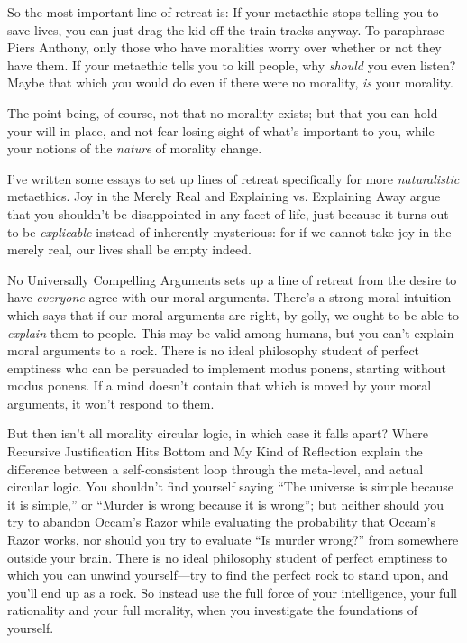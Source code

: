 {
 So the most important line of retreat is: If your metaethic stops
telling you to save lives, you can just drag the kid off the train
tracks anyway. To paraphrase Piers Anthony, only those who have
moralities worry over whether or not they have them. If your metaethic
tells you to kill people, why \textit{should} you even listen? Maybe
that which you would do even if there were no morality, \textit{is}
your morality.}

{
 The point being, of course, not that no morality exists; but that
you can hold your will in place, and not fear losing sight of
what's important to you, while your notions of the
\textit{nature} of morality change.}

{
 I've written some essays to set up lines of
retreat specifically for more \textit{naturalistic} metaethics. Joy in
the Merely Real and Explaining vs. Explaining Away argue that you
shouldn't be disappointed in any facet of life, just
because it turns out to be \textit{explicable} instead of inherently
mysterious: for if we cannot take joy in the merely real, our lives
shall be empty indeed.}

{
 No Universally Compelling Arguments sets up a line of retreat from
the desire to have \textit{everyone} agree with our moral arguments.
There's a strong moral intuition which says that if our
moral arguments are right, by golly, we ought to be able to
\textit{explain} them to people. This may be valid among humans, but
you can't explain moral arguments to a rock. There is
no ideal philosophy student of perfect emptiness who can be persuaded
to implement modus ponens, starting without modus ponens. If a mind
doesn't contain that which is moved by your moral
arguments, it won't respond to them.}

{
 But then isn't all morality circular logic, in
which case it falls apart? Where Recursive Justification Hits Bottom
and My Kind of Reflection explain the difference between a
self-consistent loop through the meta-level, and actual circular logic.
You shouldn't find yourself saying
``The universe is simple because it is
simple,'' or ``Murder is wrong
because it is wrong''; but neither should you try to
abandon Occam's Razor while evaluating the probability
that Occam's Razor works, nor should you try to
evaluate ``Is murder wrong?'' from
somewhere outside your brain. There is no ideal philosophy student of
perfect emptiness to which you can unwind yourself---try to find the
perfect rock to stand upon, and you'll end up as a
rock. So instead use the full force of your intelligence, your full
rationality and your full morality, when you investigate the
foundations of yourself.}

